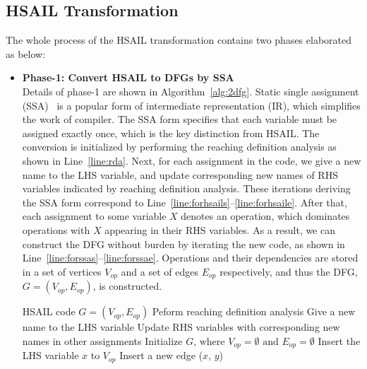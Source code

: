 \subsection{HSAIL Transformation}
\label{sec:trans}
The whole process of the HSAIL transformation contains two phases elaborated as below:
\begin{itemize}
    \item \textbf{Phase-1: Convert HSAIL to DFGs by SSA} \\\indent
        Details of phase-1 are shown in Algorithm~\ref{alg:2dfg}.
        Static single assignment (SSA)~\cite{ssa} is a popular form of intermediate representation (IR), which simplifies the work of compiler.
        The SSA form specifies that each variable must be assigned exactly once, which is the key distinction from HSAIL.
        The conversion is initialized by performing the reaching definition analysis \cite{rda} as shown in Line~\ref{line:rda}.
        Next, for each assignment in the code, we give a new name to the LHS variable, and update corresponding new names of RHS variables indicated by reaching definition analysis.
        These iterations deriving the SSA form correspond to Line~\ref{line:forhsails}--\ref{line:forhsaile}.
        After that, each assignment to some variable $X$ denotes an operation, which dominates operations with $X$ appearing in their RHS variables.
        As a result, we can construct the DFG without burden by iterating the new code, as shown in Line~\ref{line:forssas}--\ref{line:forssae}.
        Operations and their dependencies are stored in a set of vertices $V_{op}$ and a set of edges $E_{op}$ respectively, 
        and thus the DFG, $G = ( V_{op} , E_{op} )$, is constructed.
        \begin{algorithm}[ht!]    \caption{}
            \begin{algorithmic}[1]
                \Require    HSAIL code
                \Ensure     $G = ( V_{op} , E_{op} )$   
                \State      Peform reaching definition analysis     \label{line:rda}
                     \label{line:forhsails}
                \State      Give a new name to the LHS variable
                \State      Update RHS variables with corresponding new names in other assignments
                \EndFor                                                     \label{line:forhsaile}
                \State      Initialize $G \textrm{, where } V_{op} = \emptyset \textrm{ and } E_{op} = \emptyset $
                 \label{line:forssas}    
                \State      Insert the LHS variable $x$ to $V_{op}$
                \State      Insert a new edge ($x$, $y$)
                \EndFor
                \EndFor                                                         \label{line:forssae}
            \end{algorithmic}
            \label{alg:2dfg}
        \end{algorithm}


\end{itemize}
